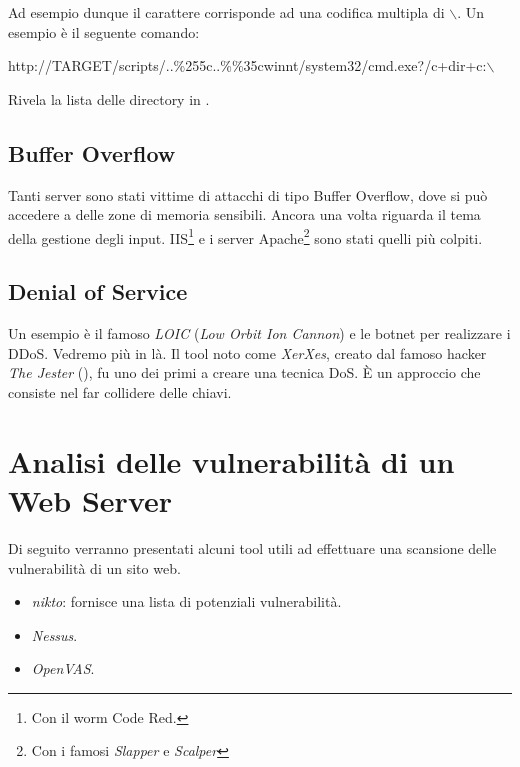 \documentclass[14pt]{extreport}
\begin{document}
Ad esempio dunque il carattere  corrisponde ad una codifica multipla di $\backslash$.
Un esempio è il seguente comando:


\begin{center}
    http://TARGET/scripts/..\%255c..\%\%35cwinnt/system32/cmd.exe?/c+dir+c:$\backslash$
\end{center}

Rivela la lista delle directory in .



\subsection{Buffer Overflow}
Tanti server sono stati vittime di attacchi di tipo Buffer Overflow, dove si può accedere a delle zone di memoria sensibili. Ancora una volta riguarda il tema della gestione degli input. IIS\footnote{Con il worm Code Red.} e i server Apache\footnote{Con i famosi \textit{Slapper} e \textit{Scalper}} sono stati quelli più colpiti.


\subsection{Denial of Service}
Un esempio è il famoso \textit{LOIC} (\textit{Low Orbit Ion Cannon}) e le botnet per realizzare i DDoS. Vedremo più in là.
Il tool noto come \textit{XerXes}, creato dal famoso hacker \textit{The Jester} (), fu uno dei primi a creare una tecnica DoS. È un approccio che consiste nel far collidere delle chiavi.


\section{Analisi delle vulnerabilità di un Web Server}
Di seguito verranno presentati alcuni tool utili ad effettuare una scansione delle vulnerabilità di un sito web.

\begin{itemize}
    \item \textit{nikto}: fornisce una lista di potenziali vulnerabilità.
    
    \item \textit{Nessus}.
    
    \item \textit{OpenVAS}.
\end{itemize}
\end{document}
